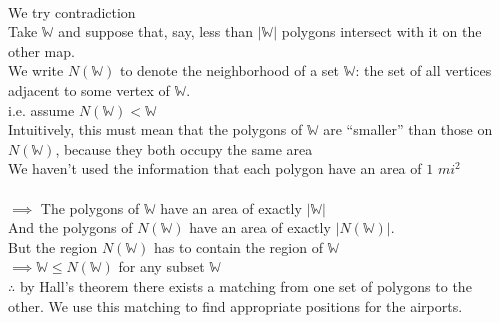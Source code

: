 \documentclass[11pt]{exam}
\begin{document}
\begin{questions}
\begin{solution}
    \\
    We try contradiction\\
    
    Take $\mathbb{W}$ and suppose that, say, less than $|\mathbb{W}|$ polygons intersect with it on the other map.\\
    We write $N(\mathbb{W})$ to denote the neighborhood of a set $\mathbb{W}$: the set of all vertices adjacent to some vertex of $\mathbb{W}$.\\
    i.e. assume $N(\mathbb{W}) < \mathbb{W}$\\
    Intuitively, this must mean that the polygons of $\mathbb{W}$ are “smaller” than those on $N(\mathbb{W})$, because they both occupy the same area\\
    We haven't used the information that each polygon have an area of $1$ $mi^2$\\\\
    $\implies$  The polygons of $\mathbb{W}$ have an area of exactly $|\mathbb{W}|$\\
    And the polygons of $N(\mathbb{W})$ have an area of exactly $|N(\mathbb{W})|$.\\
    But the region $N(\mathbb{W})$ has to contain the region of $\mathbb{W}$\\
    $\implies   \mathbb{W} \leq N(\mathbb{W})$ for any subset $\mathbb{W}$\\
    
    $\therefore$ by Hall’s theorem there exists a matching from one set of polygons to the other. We use this matching to find appropriate positions for the airports.

\end{solution}


\end{questions}
\end{document}
